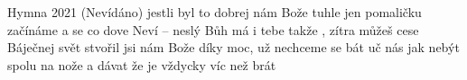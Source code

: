 \begin{TEXT}{Hymna 2021 (Nevídáno)}
\SLOKA {} jestli byl to dobrej \NL
{} nám Bože  tuhle \NL
jen pomaličku začínáme \NL
a  se co  dove\NL
\REFREN Neví – neslý \NL
{} Bůh má  i tebe \NL
takže , zítra \NL
{} můžeš  cese \NL
\SLOKA Báječnej svět stvořil jsi nám Bože\NL
díky moc, už nechceme se bát\NL
uč nás jak nebýt spolu na nože\NL
a dávat že je vždycky víc než brát\NL
\end{TEXT}